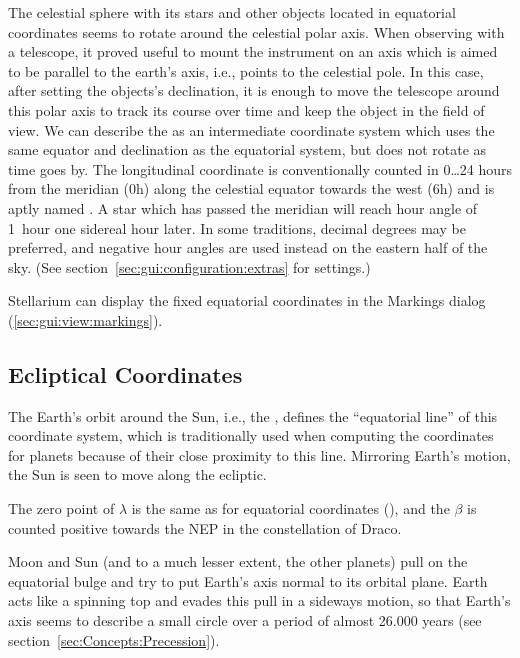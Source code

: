 The celestial sphere with its stars and other objects located in
equatorial coordinates seems to rotate around the celestial polar
axis. When observing with a telescope, it proved useful to mount the
instrument on an axis which is aimed to be parallel to the earth's
axis, i.e., points to the celestial pole. In this case, after setting
the objects's declination, it is enough to move the telescope around
this polar axis to track its course over time and keep the object in
the field of view. We can describe the  as an
  intermediate coordinate system which uses the same equator and
  declination as the equatorial system, but does not rotate as time
  goes by. The longitudinal coordinate is conventionally counted in 0\ldots24 hours 
  from the meridian (0h) along the celestial equator 
  towards the west (6h) and is aptly named . A star which has passed the meridian will reach hour angle
  of 1~hour one sidereal hour later. 
  In some traditions, decimal degrees may be preferred, 
  and negative hour angles are used instead on the eastern half of the sky. 
  (See section~\ref{sec:gui:configuration:extras} for settings.)

Stellarium can display  the fixed equatorial
coordinates in the Markings dialog (\ref{sec:gui:view:markings}).


\subsection{Ecliptical Coordinates}
\label{sec:Concepts:Ecliptical}

The Earth's orbit around the Sun, i.e., the ,
defines the ``equatorial line'' of this coordinate system, which is traditionally used when computing the coordinates for planets because of their close proximity to this line.
Mirroring Earth's motion, the Sun is seen to move along the ecliptic. 

The zero point of  $\lambda$ is the
same as for equatorial coordinates (\Aries), and the  $\beta$ is counted positive towards the
 NEP in the constellation of
Draco.

Moon and Sun (and to a much lesser extent, the other planets) pull on
the equatorial bulge and try to put Earth's axis normal to its orbital
plane. Earth acts like a spinning top and evades this pull in a
sideways motion, so that Earth's axis seems to describe a small circle
over a period of almost 26.000 years (see section~\ref{sec:Concepts:Precession}). 


